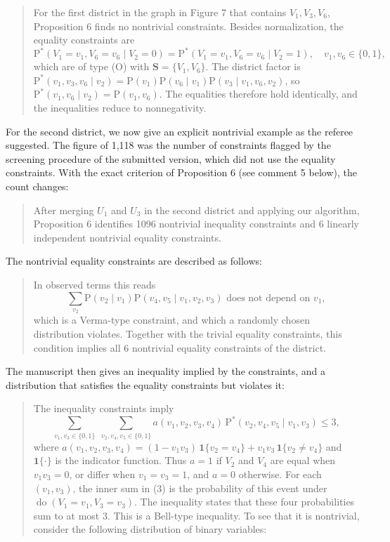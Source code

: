 \documentclass{article}
\def\Pr{{\mathrm{P}}}
\def\Pdo{{\mathrm{P}^*}}
\newcommand{\bS}{\boldsymbol{S}}
\DeclareMathOperator{\Do}{do}
\begin{document}
\begin{enumerate}
\begin{mdframed}
    \begin{quote}
    For the first district in the graph in Figure 7 that contains $V_1, V_3, V_6$, Proposition 6 finds no nontrivial constraints. Besides normalization, the equality constraints are
    \[
    \Pdo(V_1 = v_1, V_6 = v_6 \mid V_2 = 0) = \Pdo(V_1 = v_1, V_6 = v_6 \mid V_2 = 1), \quad v_1, v_6 \in \{0, 1\},
    \]
    which are of type (O) with $\bS = \{V_1, V_6\}$. The district factor is $\Pdo(v_1, v_3, v_6 \mid v_2) = \Pr(v_1)\Pr(v_6 \mid v_1)\Pr(v_3 \mid v_1, v_6, v_2)$, so $\Pdo(v_1, v_6 \mid v_2) = \Pr(v_1, v_6)$. The equalities therefore hold identically, and the inequalities reduce to nonnegativity.
    \end{quote}

For the second district, we now give an explicit nontrivial example as the referee suggested. The figure of 1,118 was the number of constraints flagged by the screening procedure of the submitted version, which did not use the equality constraints. With the exact criterion of Proposition 6 (see comment 5 below), the count changes:
    \begin{quote}
    After merging $U_1$ and $U_3$ in the second district and applying our algorithm, Proposition 6 identifies 1096 nontrivial inequality constraints and 6 linearly independent nontrivial equality constraints.
    \end{quote}
    The nontrivial equality constraints are described as follows:
    \begin{quote}
    In observed terms this reads
    \[
    \sum_{v_2} \Pr(v_2 \mid v_1)\Pr(v_4, v_5 \mid v_1, v_2, v_3) \mbox{ does not depend on } v_1,
    \]
    which is a Verma-type constraint, and which a randomly chosen distribution violates. Together with the trivial equality constraints, this condition implies all 6 nontrivial equality constraints of the district.
    \end{quote}
    The manuscript then gives an inequality implied by the constraints, and a distribution that satisfies the equality constraints but violates it:
    \begin{quote}
    The inequality constraints imply
    \begin{equation}
    \sum_{v_1, v_3 \in \{0,1\}} \; \sum_{v_2, v_4, v_5 \in \{0,1\}} a(v_1, v_2, v_3, v_4) \, \Pdo(v_2, v_4, v_5 \mid v_1, v_3) \leq 3, \tag{3}
    \end{equation}
    where $a(v_1, v_2, v_3, v_4) = (1 - v_1 v_3)\,\mathbf{1}\{v_2 = v_4\} + v_1 v_3\,\mathbf{1}\{v_2 \neq v_4\}$ and $\mathbf{1}\{\cdot\}$ is the indicator function. Thus $a = 1$ if $V_2$ and $V_4$ are equal when $v_1 v_3 = 0$, or differ when $v_1 = v_3 = 1$, and $a = 0$ otherwise. For each $(v_1, v_3)$, the inner sum in (3) is the probability of this event under $\Do(V_1 = v_1, V_3 = v_3)$. The inequality states that these four probabilities sum to at most 3. This is a Bell-type inequality. To see that it is nontrivial, consider the following distribution of binary variables:

\end{quote}
\end{mdframed}
\end{enumerate}
\end{document}
